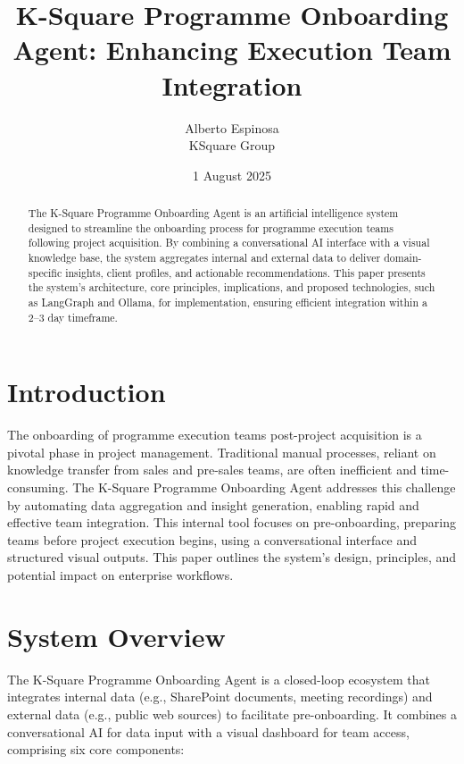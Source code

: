 \documentclass{article}
\begin{document}
\title{K-Square Programme Onboarding Agent: Enhancing Execution Team Integration}
\author{Alberto Espinosa \\ KSquare Group}
\date{1 August 2025}
\maketitle

\begin{abstract}
The K-Square Programme Onboarding Agent is an artificial intelligence system designed to streamline the onboarding process for programme execution teams following project acquisition. By combining a conversational AI interface with a visual knowledge base, the system aggregates internal and external data to deliver domain-specific insights, client profiles, and actionable recommendations. This paper presents the system’s architecture, core principles, implications, and proposed technologies, such as LangGraph and Ollama, for implementation, ensuring efficient integration within a 2–3 day timeframe.
\end{abstract}

\section{Introduction}
The onboarding of programme execution teams post-project acquisition is a pivotal phase in project management. Traditional manual processes, reliant on knowledge transfer from sales and pre-sales teams, are often inefficient and time-consuming. The K-Square Programme Onboarding Agent addresses this challenge by automating data aggregation and insight generation, enabling rapid and effective team integration. This internal tool focuses on pre-onboarding, preparing teams before project execution begins, using a conversational interface and structured visual outputs. This paper outlines the system’s design, principles, and potential impact on enterprise workflows.

\section{System Overview}
The K-Square Programme Onboarding Agent is a closed-loop ecosystem that integrates internal data (e.g., SharePoint documents, meeting recordings) and external data (e.g., public web sources) to facilitate pre-onboarding. It combines a conversational AI for data input with a visual dashboard for team access, comprising six core components:
\end{document}
